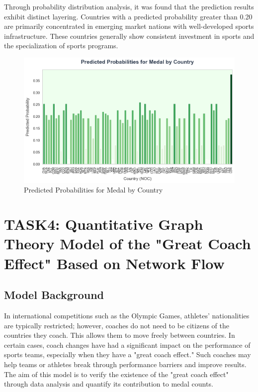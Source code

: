 \documentclass{mcmthesis}
\begin{document}
    Through probability distribution analysis, it was found that the prediction results exhibit distinct layering. Countries with a predicted probability greater than 0.20 are primarily concentrated in emerging market nations with well-developed sports infrastructure. These countries generally show consistent investment in sports and the specialization of sports programs.

\begin{figure}[h]   
    \centering          
    \includegraphics[width=12cm]{graph/rf_prediction.png}
    \caption{Predicted Probabilities for Medal by Country} \label{fig1}    
\end{figure}





\section{TASK4: Quantitative Graph Theory Model of the "Great Coach Effect" Based on Network Flow}
\subsection{Model Background}
In international competitions such as the Olympic Games, athletes' nationalities are typically restricted; however, coaches do not need to be citizens of the countries they coach. This allows them to move freely between countries. In certain cases, coach changes have had a significant impact on the performance of sports teams, especially when they have a "great coach effect." Such coaches may help teams or athletes break through performance barriers and improve results. The aim of this model is to verify the existence of the "great coach effect" through data analysis and quantify its contribution to medal counts.
\end{document}
